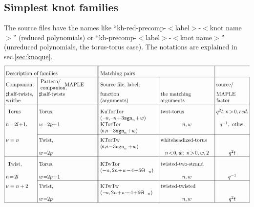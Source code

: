 \documentclass[11pt]{article}
\def\be{\begin{eqnarray}}
\def\ee{\end{eqnarray}}
\def\sgn{\mathtt{sgn}}
\begin{document}
\subsection{Simplest knot families}
The source files have the names like ``kh-red-precomp-$<$label$>$-$<$knot name$>$'' (reduced polynomials) or ``kh-precomp-$<$label$>$-$<$knot name$>$'' (unreduced polynomials, the torus-torus case). The notations are explained in sec.\ref{sec:knoque}. 
\be
\arraycolsep=1mm
\begin{array}{|p{2cm}|p{2cm}||p{3.8cm}|p{3.5cm}|p{1.8cm}|}
	\hline\multicolumn{2}{|p{6cm}||}{\rule{0pt}{6mm}Description of families}&\multicolumn{2}{p{6cm}|}{\rule{0pt}{6mm}Matching pairs}\\	
	\hline\rule{0pt}{6mm}Companion,&$\begin{array}{p{1.5cm}}Pattern/\\companion,\end{array}$MAPLE&Source file, label;&&source/\\
	$\sharp$half-twists,&$\sharp$half-twists&function&the matching&MAPLE\\
	writhe&&%
	(arguments)&arguments&factor\\
	\hline\rule{0pt}{6mm}	
	Torus&Torus,&KuTorTor \mbox{$(-\!n,\!-\!n\!+\!3\sgn_n\!+\!w)$}&twst-torus&\multicolumn{1}{c|}{q^2t,n\!>\!0, red.}\\
	$n\!=\!2l\!+\!1$,&$w\!=\!\!2p\!+\!1$&KTorTor \mbox{$(\!n,\!\!n\!-\!3\sgn_n\!+\!w)$} %
	&\multicolumn{1}{c|}{n,w}&
	\multicolumn{1}{c|}{q^{-1}, \text{ othw.}}\\
	\cline{2-2}\cline{3-5}\rule{0pt}{5mm}$\nu=n$&Twist, &KTorTw \mbox{$(\!n,\!\!n\!-\!3\sgn_n+\!w)$}&whiteheadized-torus&\\
	&$w\!=\!\!2p\!$
	& %
	&\multicolumn{1}{c|}{n\!<\!0,w;\ n\!>\!0,w,2}&\multicolumn{1}{c|}{q^2t}\\
	\hline\rule{0pt}{6mm}
	Twist,&Torus,&KTwTor \mbox{$(-n,2n\!+\!w\!-\!4\!+\!6\Theta_{-n})$}&twisted-two-strand&\\
	$n\!=\!2l$&$w\!=\!\!2p\!+\!1$
	& %
	&\multicolumn{1}{c|}{n,w}&\multicolumn{1}{c|}{q^{-1}}\\
	\cline{2-2}\cline{3-5}\rule{0pt}{5mm}$\nu=n+2$&Twist, &KTwTw \mbox{$(-\!n,2n\!+\!w\!-\!4\!+\!6\Theta_{-n})$}&twisted-twisted&\\
	&$w\!=\!\!2p\!$& %
	&\multicolumn{1}{c|}{n,w}&\multicolumn{1}{c|}{q^2t}\\
	\hline
\end{array}
\label{TorTwData}
\ee
\end{document}
